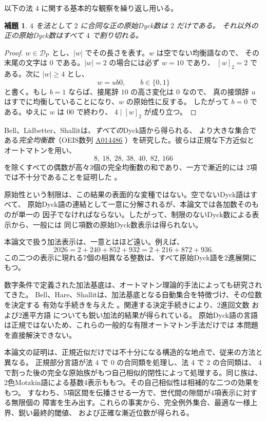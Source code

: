 \documentclass[12pt]{ltjsarticle}
\theoremstyle{plain}
\newtheorem{lemma}[theorem]{補題}
\theoremstyle{definition}
\theoremstyle{plain}
\newcommand{\DP}{\mathcal{D}_{\mathrm{P}}}
\newcommand{\seqnum}[1]{\href{https://oeis.org/#1}{\textrm{\underline{#1}}}}
\begin{document}
以下の法 $4$ に関する基本的な観察を繰り返し用いる。

\begin{lemma}\label{lem:mod4}
$4$ を法として $2$ に合同な正の原始Dyck数は $2$ だけである。
それ以外の正の原始Dyck数はすべて $4$ で割り切れる。
\end{lemma}

\begin{proof}
$w\in\DP$ とし、$|w|$ でその長さを表す。$w$ は空でない均衡語なので、
その末尾の文字は $0$ である。$|w|=2$ の場合には必ず $w=10$ であり、
$[w]_2=2$ である。次に $|w|\geq4$ とし、
\[
 w=ub0,\qquad b\in\{0,1\}
\]
と書く。もし $b=1$ ならば、接尾辞 $10$ の高さ変化は $0$ なので、
真の接頭辞 $u$ はすでに均衡していることになり、$w$ の原始性に反する。
したがって $b=0$ である。ゆえに $w$ は $00$ で終わり、
$4\mid[w]_2$ が成り立つ。
\end{proof}

Bell、Lidbetter、Shallitは、\emph{すべての}Dyck語から得られる、
より大きな集合である\emph{完全均衡数}（OEIS数列
\seqnum{A014486} \cite{OEIS-A014486}）を研究した。彼らは正規な下方近似と
オートマトンを用い、
\[
        8,\ 18,\ 28,\ 38,\ 40,\ 82,\ 166
\]
を除くすべての偶数が高々3個の完全均衡数の和であり、一方で漸近的には
2項では不十分であることを証明した \cite[Thm.\ 14]{BLS}。

原始性という制限は、この結果の表面的な変種ではない。空でないDyck語はすべて、
原始Dyck語の連結として一意に分解されるが、本論文では各加数そのものが単一の
因子でなければならない。したがって、制限のないDyck数による表示から、一般には
同じ項数の原始Dyck数表示は得られない。

本論文で扱う加法表示は、一意とはほど遠い。例えば、
\[
 2026=2+240+852+932=2+216+872+936.
\]
この二つの表示に現れる7個の相異なる整数は、すべて原始Dyck語を2進展開にもつ。

数字条件で定義された加法基底は、オートマトン理論的手法によっても研究されてきた。
Bell、Hare、Shallitは、加法基底となる自動集合を特徴づけ、その位数を決定する
有効な手続きを与えた \cite{BHS}。関連する決定手続きにより、2進回文数
\cite{RSS} および2進平方語 \cite{MNRS} についても鋭い加法的結果が得られている。
原始Dyck語の言語は正規ではないため、これらの一般的な有限オートマトン手法だけでは
本問題を直接解決できない。

本論文の証明は、正規近似だけでは不十分になる構造的な地点で、従来の方法と異なる。
正規部分言語が法 $4$ で $0$ の合同類を処理し、法 $4$ で $2$ の合同類は、
$4$ で割った後の完全な原始族がもつ自己相似的閉性によって処理する。同じ族は、
2色Motzkin語による基数4表示ももつ。その自己相似性は相補的な二つの効果をもつ。
すなわち、5項区間を伝播させる一方で、世代間の隙間が4項表示に対する無限個の
障害を生み出す。これらの事実から、完全例外集合、最適な一様上界、鋭い最終的閾値、
および正確な漸近位数が得られる。
\end{document}
